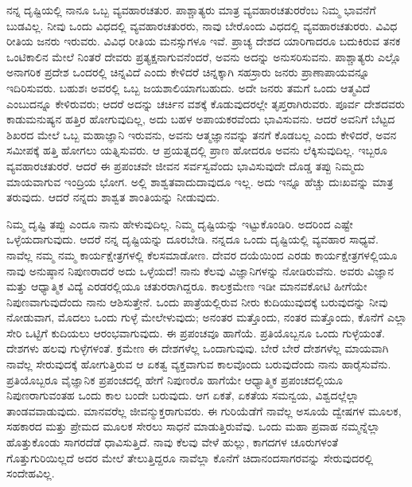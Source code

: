 \vskip 0.2cm 

ನನ್ನ ದೃಷ್ಟಿಯಲ್ಲಿ ನಾನೂ ಒಬ್ಬ ವ್ಯವಹಾರಚತುರ. ಪಾಶ್ಚಾತ್ಯರು ಮಾತ್ರ ವ್ಯವಹಾರಚತುರರೆಂಬ ನಿಮ್ಮ ಭಾವನೆಗೆ ಬುಡವಿಲ್ಲ. ನೀವು ಒಂದು ವಿಧದಲ್ಲಿ ವ್ಯವಹಾರಚತುರರು, ನಾವು ಬೇರೊಂದು ವಿಧದಲ್ಲಿ ವ್ಯವಹಾರಚತುರರು. ವಿವಿಧ ರೀತಿಯ ಜನರು ಇರುವರು. ವಿವಿಧ ರೀತಿಯ ಮನಸ್ಸುಗಳೂ ಇವೆ. ಪ್ರಾಚ್ಯ ದೇಶದ ಯಾರಿಗಾದರೂ ಬದುಕಿರುವ ತನಕ ಒಂಟಿಕಾಲಿನ ಮೇಲೆ ನಿಂತರೆ ದೇವರು ಪ್ರತ್ಯಕ್ಷನಾಗುವನೆಂದರೆ, ಅವನು ಅದನ್ನು ಅನುಸರಿಸುವನು. ಪಾಶ್ಚಾತ್ಯರು ಎಲ್ಲೊ ಅನಾಗರಿಕ ಪ್ರದೇಶ ಒಂದರಲ್ಲಿ ಚಿನ್ನವಿದೆ ಎಂದು ಕೇಳಿದರೆ ಚಿನ್ನಕ್ಕಾಗಿ ಸಹಸ್ರಾರು ಜನರು ಪ್ರಾಣಾಪಾಯವನ್ನೂ ಇದಿರಿಸುವರು. ಬಹುಶಃ ಅವರಲ್ಲಿ ಒಬ್ಬ ಜಯಶಾಲಿಯಾಗಬಹುದು. ಅದೇ ಜನರು ತಮಗೆ ಒಂದು ಆತ್ಮವಿದೆ ಎಂಬುದನ್ನೂ ಕೇಳಿರುವರು; ಆದರೆ ಅದನ್ನು ಚರ್ಚಿನ ವಶಕ್ಕೆ ಕೊಡುವುದರಲ್ಲೇ ತೃಪ್ತರಾಗಿರುವರು. ಪೂರ್ವ ದೇಶದವರು ಕಾಡುಮನುಷ್ಯನ ಹತ್ತಿರ ಹೋಗುವುದಿಲ್ಲ, ಅದು ಬಹಳ ಅಪಾಯಕರವೆಂದು ಭಾವಿಸುವನು. ಆದರೆ ಅವನಿಗೆ ಬೆಟ್ಟದ ಶಿಖರದ ಮೇಲೆ ಒಬ್ಬ ಮಹಾಜ್ಞಾನಿ ಇರುವನು, ಅವನು ಆತ್ಮಜ್ಞಾನವನ್ನು ತನಗೆ ಕೊಡಬಲ್ಲ ಎಂದು ಕೇಳಿದರೆ, ಅವನ ಸಮೀಪಕ್ಕೆ ಹತ್ತಿ ಹೋಗಲು ಯತ್ನಿಸುವರು. ಆ ಪ್ರಯತ್ನದಲ್ಲಿ ಪ್ರಾಣ ಹೋದರೂ ಅವನು ಲೆಕ್ಕಿಸುವುದಿಲ್ಲ. ಇಬ್ಬರೂ ವ್ಯವಹಾರಚತುರರೆ. ಆದರೆ ಈ ಪ್ರಪಂಚವೇ ಜೀವನ ಸರ್ವಸ್ವವೆಂದು ಭಾವಿಸುವುದೇ ದೊಡ್ಡ ತಪ್ಪು ನಿಮ್ಮದು ಮಾಯವಾಗುವ ಇಂದ್ರಿಯ ಭೋಗ. ಅಲ್ಲಿ ಶಾಶ್ವತವಾದುದಾವುದೂ ಇಲ್ಲ. ಅದು ಇನ್ನೂ ಹೆಚ್ಚು ದುಃಖವನ್ನು ಮಾತ್ರ ತರುವುದು. ಆದರೆ ನನ್ನದು ಶಾಶ್ವತ ಶಾಂತಿಯನ್ನು ನೀಡುವುದು.

\eject

ನಿಮ್ಮ ದೃಷ್ಟಿ ತಪ್ಪು ಎಂದೂ ನಾನು ಹೇಳುವುದಿಲ್ಲ. ನಿಮ್ಮ ದೃಷ್ಟಿಯನ್ನು ಇಟ್ಟುಕೊಂಡಿರಿ. ಅದರಿಂದ ಎಷ್ಟೇ ಒಳ್ಳೆಯದಾಗುವುದು. ಆದರೆ ನನ್ನ ದೃಷ್ಟಿಯನ್ನು ದೂರಬೇಡಿ. ನನ್ನದೂ ಒಂದು ದೃಷ್ಟಿಯಲ್ಲಿ ವ್ಯವಹಾರ ಸಾಧ್ಯವೆ. ನಾವೆಲ್ಲ ನಮ್ಮ ನಮ್ಮ ಕಾರ್ಯಕ್ಷೇತ್ರಗಳಲ್ಲಿ ಕೆಲಸಮಾಡೋಣ. ದೇವರ ದಯೆಯಿಂದ ಎರಡು ಕಾರ್ಯಕ್ಷೇತ್ರಗಳಲ್ಲಿಯೂ ನಾವು ಅನುಷ್ಠಾನ ನಿಪುಣರಾದರೆ ಅದು ಒಳ್ಳೆಯದೆ! ನಾನು ಕೆಲವು ವಿಜ್ಞಾನಿಗಳನ್ನು ನೋಡಿರುವೆನು. ಅವರು ವಿಜ್ಞಾನ ಮತ್ತು ಆಧ್ಯಾತ್ಮಿಕ ವಿದ್ಯೆ ಎರಡರಲ್ಲಿಯೂ ಚತುರರಾಗಿದ್ದರೂ. ಕಾಲಕ್ರಮೇಣ ಇಡೀ ಮಾನವಕೋಟಿ ಹೀಗೆಯೇ ನಿಪುಣವಾಗುವುದೆಂದು ನಾನು ಆಶಿಸುತ್ತೇನೆ. ಒಂದು ಪಾತ್ರೆಯಲ್ಲಿರುವ ನೀರು ಕುದಿಯುವುದಕ್ಕೆ ಬರುವುದನ್ನು ನೀವು ನೋಡುವಾಗ, ಮೊದಲು ಒಂದು ಗುಳ್ಳೆ ಮೇಲೇಳುವುದು; ಅನಂತರ ಮತ್ತೊಂದು, ನಂತರ ಮತ್ತೊಂದು, ಕೊನೆಗೆ ಎಲ್ಲಾ ಸೇರಿ ಒಟ್ಟಿಗೆ ಕುದಿಯಲು ಆರಂಭವಾಗುವುದು. ಈ ಪ್ರಪಂಚವೂ ಹಾಗೆಯೆ. ಪ್ರತಿಯೊಬ್ಬನೂ ಒಂದು ಗುಳ್ಳೆಯಂತೆ. ದೇಶಗಳು ಹಲವು ಗುಳ್ಳೆಗಳಂತೆ. ಕ್ರಮೇಣ ಈ ದೇಶಗಳೆಲ್ಲ ಒಂದಾಗುವುವು. ಬೇರೆ ಬೇರೆ ದೇಶಗಳೆಲ್ಲ ಮಾಯವಾಗಿ ನಾವೆಲ್ಲ ಸೇರುವುದಕ್ಕೆ ಹೋಗುತ್ತಿರುವ ಆ ಏಕತ್ವ ವ್ಯಕ್ತವಾಗುವ ಕಾಲವೊಂದು ಬರುವುದೆಂದು ನಾನು ಹಾರೈಸುವೆನು. ಪ್ರತಿಯೊಬ್ಬರೂ ವೈಜ್ಞಾನಿಕ ಪ್ರಪಂಚದಲ್ಲಿ ಹೇಗೆ ನಿಪುಣರೊ ಹಾಗೆಯೇ ಆಧ್ಯಾತ್ಮಿಕ ಪ್ರಪಂಚದಲ್ಲಿಯೂ ನಿಪುಣರಾಗುವಂತಹ ಒಂದು ಕಾಲ ಬಂದೇ ಬರುವುದು. ಆಗ ಏಕತೆ, ಏಕತೆಯ ಸಮನ್ವಯ, ವಿಶ್ವದಲ್ಲೆಲ್ಲಾ ತಾಂಡವವಾಡುವುದು. ಮಾನವರೆಲ್ಲ ಜೀವನ್ಮುಕ್ತರಾಗುವರು. ಈ ಗುರಿಯೆಡೆಗೆ ನಾವೆಲ್ಲ ಅಸೂಯೆ ದ್ವೇಷಗಳ ಮೂಲಕ, ಸಹಕಾರದ ಮತ್ತು ಪ್ರೇಮದ ಮೂಲಕ ಸೇರಲು ಸಾಧನೆ ಮಾಡುತ್ತಿರುವೆವು. ಒಂದು ಮಹಾ ಪ್ರವಾಹ ನಮ್ಮನ್ನೆಲ್ಲಾ ಹೊತ್ತುಕೊಂಡು ಸಾಗರದೆಡೆ ಧಾವಿಸುತ್ತಿದೆ. ನಾವು ಕೆಲವು ವೇಳೆ ಹುಲ್ಲು, ಕಾಗದಗಳ ಚೂರುಗಳಂತೆ ಗೊತ್ತುಗುರಿಯಿಲ್ಲದೆ ಅದರ ಮೇಲೆ ತೇಲುತ್ತಿದ್ದರೂ ನಾವೆಲ್ಲಾ ಕೊನೆಗೆ ಚಿದಾನಂದಸಾಗರವನ್ನು ಸೇರುವುದರಲ್ಲಿ ಸಂದೇಹವಿಲ್ಲ.

